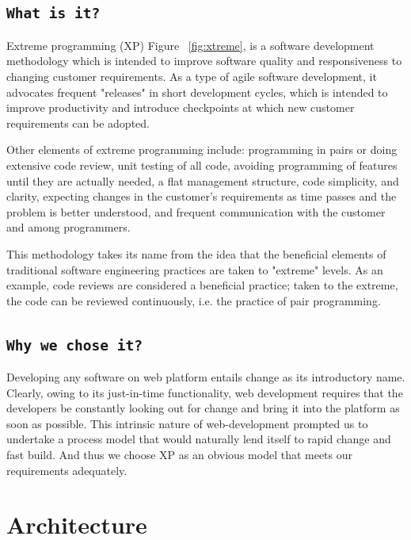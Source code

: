 \subsection{\texttt{What is it?}}

Extreme programming (XP) Figure ~\ref{fig:xtreme}, is a software development methodology which is intended to improve software quality and responsiveness to changing customer requirements. As a type of agile software development, it advocates frequent "releases" in short development cycles, which is intended to improve productivity and introduce checkpoints at which new customer requirements can be adopted.

Other elements of extreme programming include: programming in pairs or doing extensive code review, unit testing of all code, avoiding programming of features until they are actually needed, a flat management structure, code simplicity, and clarity, expecting changes in the customer's requirements as time passes and the problem is better understood, and frequent communication with the customer and among programmers.

This methodology takes its name from the idea that the beneficial elements of traditional software engineering practices are taken to "extreme" levels. As an example, code reviews are considered a beneficial practice; taken to the extreme, the code can be reviewed continuously, i.e. the practice of pair programming.

\subsection{\texttt{Why we chose it?}}

Developing any software on web platform entails change as its introductory name. Clearly, owing to its just-in-time functionality, web development requires that the developers be constantly looking out for change and bring it into the platform as soon as possible. This intrinsic nature of web-development prompted us to undertake a process model that would naturally lend itself to rapid change and fast build. And thus we choose XP as an obvious model that meets our requirements adequately.

\section{Architecture}

